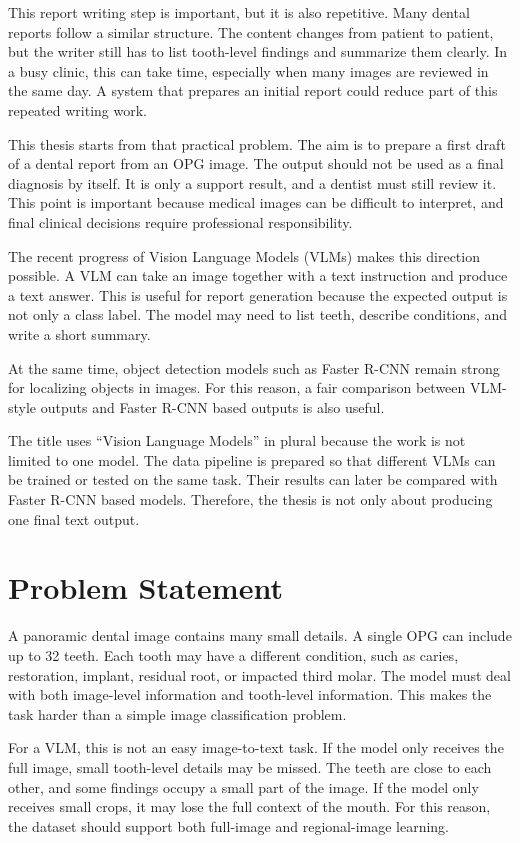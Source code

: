 \documentclass[a4paper,12pt]{report}
\begin{document}
This report writing step is important, but it is also repetitive. Many dental reports follow a similar structure. The content changes from patient to patient, but the writer still has to list tooth-level findings and summarize them clearly. In a busy clinic, this can take time, especially when many images are reviewed in the same day. A system that prepares an initial report could reduce part of this repeated writing work.

This thesis starts from that practical problem. The aim is to prepare a first draft of a dental report from an OPG image. The output should not be used as a final diagnosis by itself. It is only a support result, and a dentist must still review it. This point is important because medical images can be difficult to interpret, and final clinical decisions require professional responsibility.

The recent progress of Vision Language Models (VLMs) makes this direction possible. A VLM can take an image together with a text instruction and produce a text answer. This is useful for report generation because the expected output is not only a class label. The model may need to list teeth, describe conditions, and write a short summary.

At the same time, object detection models such as Faster R-CNN remain strong for localizing objects in images. For this reason, a fair comparison between VLM-style outputs and Faster R-CNN based outputs is also useful.

The title uses ``Vision Language Models'' in plural because the work is not limited to one model. The data pipeline is prepared so that different VLMs can be trained or tested on the same task. Their results can later be compared with Faster R-CNN based models. Therefore, the thesis is not only about producing one final text output. 
\section{Problem Statement}
A panoramic dental image contains many small details. A single OPG can include up to 32 teeth. Each tooth may have a different condition, such as caries, restoration, implant, residual root, or impacted third molar. The model must deal with both image-level information and tooth-level information. This makes the task harder than a simple image classification problem.

For a VLM, this is not an easy image-to-text task. If the model only receives the full image, small tooth-level details may be missed. The teeth are close to each other, and some findings occupy a small part of the image. If the model only receives small crops, it may lose the full context of the mouth. For this reason, the dataset should support both full-image and regional-image learning.
\end{document}
